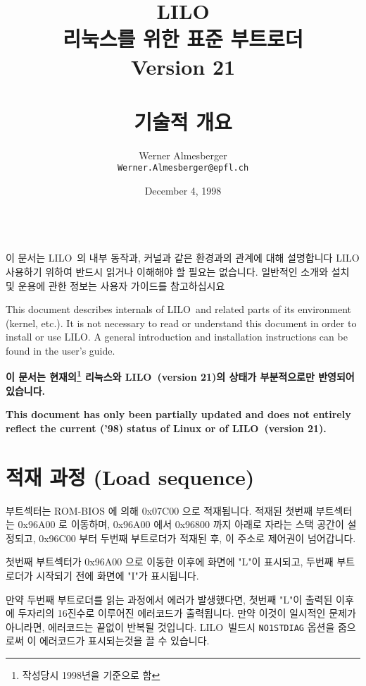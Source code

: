 \documentclass[fullpage]{article}
\def\LILO{LILO}
\begin{document}
\title{\LILO \\
  \Large
  리눅스를 위한 표준 부트로더 \\
  Version 21 \\ ~\\
  \bf 기술적 개요}
\author{Werner Almesberger \\
  {\tt Werner.Almesberger@epfl.ch}}
\date{December 4, 1998}

\maketitle
{
  \parskip=-4pt
  \setcounter{tocdepth}{1}
  \tableofcontents
}

~\\
이 문서는 \LILO\ 의 내부 동작과, 커널과 같은 환경과의 관계에 대해 설명합니다
\LILO\를 사용하기 위하여 반드시 읽거나 이해해야 할 필요는 없습니다.
일반적인 소개와 설치 및 운용에 관한 정보는 사용자 가이드를 참고하십시요

This document describes internals of \LILO\ and related parts of its
environment (kernel, etc.). It is not necessary to read or understand
this document in order to install or use \LILO. A general introduction
and installation instructions can be found in the user's guide.

{\bf 이 문서는 현재의\footnote{작성당시 1998년을 기준으로 함} 리눅스와 
\LILO\ (version 21)의 상태가 부분적으로만 반영되어 있습니다.}

{\bf This document has only been partially updated and does not entirely
reflect the current ('98) status of Linux or of \LILO\ (version 21).}


\section{적재 과정 (Load sequence)}
\label{load}

부트섹터는 ROM-BIOS 에 의해 0x07C00 으로 적재됩니다.
적재된 첫번째 부트섹터는 0x96A00 로 이동하며,
0x96A00 에서 0x96800 까지 아래로 자라는 스택 공간이 설정되고,
0x96C00 부터 두번째 부트로더가 적재된 후, 이 주소로 제어권이 넘어갑니다.

첫번째 부트섹터가 0x96A00 으로 이동한 이후에 화면에 "L"이 표시되고,
두번째 부트로더가 시작되기 전에 화면에 "I"가 표시됩니다.

만약 두번째 부트로더를 읽는 과정에서 에러가 발생했다면,
첫번째 "L"이 출력된 이후에 두자리의 16진수로 이루어진 에러코드가 출력됩니다.
만약 이것이 일시적인 문제가 아니라면, 에러코드는 끝없이 반복될 것입니다.
\LILO\ 빌드시 {\tt NO1STDIAG} 옵션을 줌으로써 이 에러코드가 표시되는것을 끌 수 있습니다.
\end{document}

